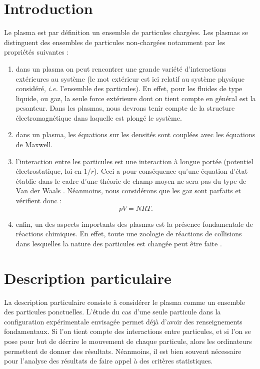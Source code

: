 \documentclass{book}
\begin{document}
\section{Introduction}
Le plasma est par d\'efinition un ensemble de particules charg\'ees.
Les plasmas se distinguent des ensembles de particules non-charg\'ees
notamment par les propri\'et\'es suivantes :
\begin{enumerate}
\item dans un plasma on peut rencontrer une  grande vari\'et\'e
d'interactions ext\'erieures au syst\`eme
(le mot ext\'erieur est ici relatif au syst\`eme
physique consid\'er\'e, {\it i.e.} l'ensemble des particules).
En effet, pour les fluides de type liquide, ou gaz, la seule force
ext\'erieure dont on tient compte en g\'en\'eral est la pesanteur.
Dans les plasmas, nous devrons tenir compte de la 
structure \'electromagn\'etique dans laquelle est plong\'e le syst\`eme.

\item dans un plasma, les \'equations sur les densit\'es sont
coupl\'ees avec les \'equations de Maxwell.

\item  l'interaction entre les particules est une interaction \`a longue
port\'ee (potentiel \'electrostatique, loi en $1/r$).  Ceci a pour
cons\'equence qu'une \'equation d'\'etat  \'etablie dans le
cadre d'une 
th\'eorie de champ moyen
 ne sera pas du type de Van der Waals
\cite{Diu89}. 
N\'eanmoins, nous consid\'erons que les gaz sont 
parfaits  et
v\'erifient donc : 
\begin{equation}
p V=N R T.
\end{equation}


\item enfin, un des aspects importants des plasmas est la pr\'esence
fondamentale de r\'eactions chimiques. En effet, toute une
zoologie de r\'eactions de collisions dans lesquelles la nature des
particules est chang\'ee peut \^etre faite \cite{Delcroix94}.
\end{enumerate}





\section{Description particulaire}
La description particulaire consiste \`a
consid\'erer le plasma comme un 
ensemble  des particules ponctuelles.
L'\'etude du cas d'une seule particule dans la configuration
exp\'erimentale envisag\'ee permet d\'ej\`a d'avoir des renseignements
fondamentaux. 
Si l'on tient compte des interactions entre particules, et si l'on se
pose pour but de d\'ecrire le mouvement de chaque particule, alors les
ordinateurs permettent de donner des r\'esultats.
N\'eanmoins, il est bien souvent n\'ecessaire pour l'analyse des r\'esultats
de faire appel \`a des crit\`eres statistiques.
\end{document}
